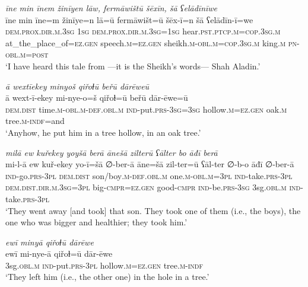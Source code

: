 \ea \label{ZB.37}
\textit{īne min īnem žinīyen lāw, fermāwištū šēxīn, šā ʕelādīnīwe} \\ 
\gll īne min īne=m žinīye=n lā=ū fermāwišt=ū šēx-ī=n šā ʕelādīn-ī=we \\ 
 \textsc{dem.prox}\textsc{.dir}\textsc{.m}\textsc{.3sg} \textsc{1sg} \textsc{dem.prox}\textsc{.dir}\textsc{.m}\textsc{.3sg}\textsc{=\textsc{1sg}} hear\textsc{.pst}\textsc{.ptcp}\textsc{.m}\textsc{=cop}\textsc{.3sg}\textsc{.m} at\_the\_place\_of\textsc{\textsc{=ez.gen}} speech\textsc{.m}\textsc{\textsc{=ez.gen}} sheikh\textsc{.m}\textsc{-obl}\textsc{.m}\textsc{=cop}\textsc{.3sg}\textsc{.m} king\textsc{.m} \textsc{pn}\textsc{-obl}\textsc{.m}\textsc{=\textsc{post}} \\ 
\glt `I have heard this tale from —it is the Sheikh’s words— Shah Aladin.'
\z 
 
\ea \label{ZB.38}
\textit{ā wextīekey minyoš qiřoɫū beřū dārēweū} \\ 
\gll ā wext-ī-ekey mi-nye-o=š qiřoɫ=ū beřū dār-ēwe=ū \\ 
 \textsc{dem.dist} time\textsc{.m}\textsc{-obl}\textsc{.m}\textsc{-def}\textsc{.obl}\textsc{.m} \textsc{ind-}put\textsc{.prs}\textsc{-3sg}\textsc{=3sg} hollow\textsc{.m}\textsc{\textsc{=ez.gen}} oak\textsc{.m} tree\textsc{.m}\textsc{-indf}=and \\ 
\glt `Anyhow, he put him in a tree hollow, in an oak tree.'
\z 
 
\ea \label{ZB.40}
\textit{milā ew kuřekey yoyšā berā ānešā zilterū ʕālter bo āđī berā} \\ 
\gll mi-l-ā ew kuř-ekey yo-ī=šā ∅-ber-ā āne=šā zil-ter=ū ʕāl-ter ∅-b-o āđī ∅-ber-ā \\ 
 \textsc{ind-}go\textsc{.prs}\textsc{-3pl} \textsc{dem.dist} son/boy\textsc{.m}\textsc{-def}\textsc{.obl}\textsc{.m} one\textsc{.m}\textsc{-obl}\textsc{.m}\textsc{=3pl} \textsc{ind-}take\textsc{.prs}\textsc{-3pl} \textsc{dem.dist}\textsc{.dir}\textsc{.m}\textsc{.3sg}\textsc{=3pl} big\textsc{-cmpr}\textsc{\textsc{=ez.gen}} good\textsc{-cmpr} \textsc{ind-}be\textsc{.prs}\textsc{-3sg} 3sg\textsc{.obl}\textsc{.m} \textsc{ind-}take\textsc{.prs}\textsc{-3pl} \\ 
\glt `They went away [and took] that son. They took one of them (i.e., the boys), the one who was bigger and healthier; they took him.'
\z 
 
\ea \label{ZB.41}
\textit{ewī minyā qiřoɫū dārēwe} \\ 
\gll ewī mi-nye-ā qiřoɫ=ū dār-ēwe \\ 
 3sg\textsc{.obl}\textsc{.m} \textsc{ind-}put\textsc{.prs}\textsc{-3pl} hollow\textsc{.m}\textsc{\textsc{=ez.gen}} tree\textsc{.m}\textsc{-indf} \\ 
\glt `They left him (i.e., the other one) in the hole in a tree.'
\z 
 
